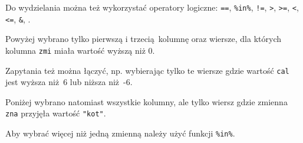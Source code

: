 \documentclass[paper=6in:9in,pagesize=pdftex,headinclude=on,footinclude=on,10pt]{scrbook}
\newenvironment{Shaded}{\begin{snugshade}}{\end{snugshade}}
\newcommand{\CommentTok}[1]{\textcolor[rgb]{0.56,0.35,0.01}{\textit{#1}}}
\newcommand{\DecValTok}[1]{\textcolor[rgb]{0.00,0.00,0.81}{#1}}
\newcommand{\KeywordTok}[1]{\textcolor[rgb]{0.13,0.29,0.53}{\textbf{#1}}}
\newcommand{\NormalTok}[1]{#1}
\newcommand{\OperatorTok}[1]{\textcolor[rgb]{0.81,0.36,0.00}{\textbf{#1}}}
\newcommand{\StringTok}[1]{\textcolor[rgb]{0.31,0.60,0.02}{#1}}
\begin{document}
Do wydzielania można też wykorzystać operatory logiczne: \texttt{==}, \texttt{\%in\%}, \texttt{!=}, \texttt{\textgreater{}}, \texttt{\textgreater{}=}, \texttt{\textless{}}, \texttt{\textless{}=}, \texttt{\&}, \texttt{\textbar{}}.

\begin{Shaded}
\end{Shaded}

Powyżej wybrano tylko pierwszą i trzecią~kolumnę oraz wiersze, dla których kolumna \texttt{zmi} miała wartość wyższą niż 0.

Zapytania też można łączyć, np. wybierając tylko te wiersze gdzie wartość \texttt{cal} jest wyższa niż~6 lub niższa niż~-6.

\begin{Shaded}
\end{Shaded}

Poniżej wybrano natomiast wszystkie kolumny, ale tylko wiersz gdzie zmienna \texttt{zna} przyjęła wartość \texttt{"kot"}.

\begin{Shaded}
\end{Shaded}

Aby wybrać więcej niż jedną zmienną należy użyć funkcji \texttt{\%in\%}.

\begin{Shaded}
\end{Shaded}
\end{document}
